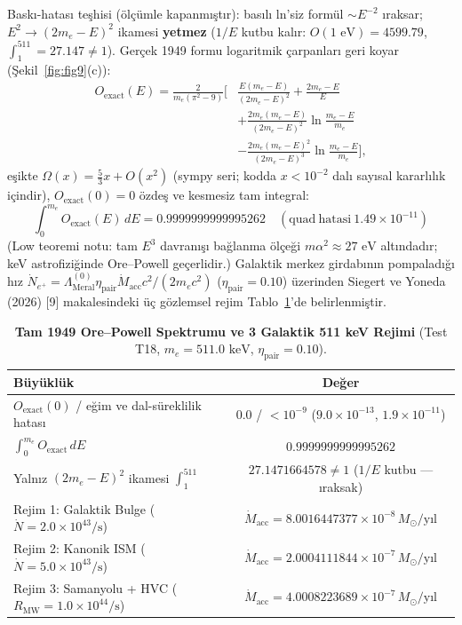 \documentclass[12pt,a4paper]{article}
\begin{document}
Baskı-hatası teşhisi (ölçümle kapanmıştır): basılı ln'siz formül $\sim E^{-2}$ ıraksar; $E^2\to(2m_e-E)^2$ ikamesi \textbf{yetmez} ($1/E$ kutbu kalır: $O(1\text{ eV})=4599.79$, $\int_1^{511}=27.147\ne1$). Gerçek 1949 formu logaritmik çarpanları geri koyar (Şekil~\ref{fig:fig9}(c)):
\begin{equation}
\begin{split}
O_{\mathrm{exact}}(E) = \frac{2}{m_e(\pi^2-9)} \Bigg[ &\frac{E(m_e-E)}{(2m_e-E)^2} + \frac{2m_e-E}{E} \\
&+ \frac{2m_e(m_e-E)}{(2m_e-E)^2}\ln\frac{m_e-E}{m_e} \\
&- \frac{2m_e(m_e-E)^2}{(2m_e-E)^3}\ln\frac{m_e-E}{m_e} \Bigg],
\end{split}
\label{eq:oexact}
\end{equation}
eşikte $\Omega(x)=\frac53x+O(x^2)$ (sympy seri; kodda $x<10^{-2}$ dalı sayısal kararlılık içindir), $O_{\mathrm{exact}}(0)=0$ özdeş ve kesmesiz tam integral:
\begin{equation}
\boxed{\int_0^{m_e} O_{\mathrm{exact}}(E)\,dE = 0.9999999999995262 \quad (\mathrm{quad\ hatasi\ } 1.49\times 10^{-11})}
\label{eq:opnorm}
\end{equation}
(Low teoremi notu: tam $E^3$ davranışı bağlanma ölçeği $m\alpha^2\approx27\text{ eV}$ altındadır; keV astrofiziğinde Ore--Powell geçerlidir.) Galaktik merkez girdabının pompaladığı hız $\dot{N}_{e^+} = \Lambda_{\mathrm{Meral}}^{(0)}\eta_{\mathrm{pair}}\dot{M}_{\mathrm{acc}}c^2/(2m_ec^2)$ ($\eta_{\mathrm{pair}}=0.10$) üzerinden Siegert ve Yoneda (2026) [9] makalesindeki üç gözlemsel rejim Tablo~\ref{tab:t18}'de belirlenmiştir.

\begin{table}[!htbp]
\centering
\footnotesize
\setlength{\tabcolsep}{3pt}
\caption{\textbf{Tam 1949 Ore--Powell Spektrumu ve 3 Galaktik 511 keV Rejimi} (Test T18, $m_e=511.0\text{ keV}$, $\eta_{\mathrm{pair}}=0.10$).}
\label{tab:t18}
\vspace{0.1cm}
\begin{tabular}{@{}l|c@{}}
\hline
Büyüklük & Değer \\
\hline
$O_{\mathrm{exact}}(0)$ / eğim ve dal-süreklilik hatası & $0.0$ / $<10^{-9}$ ($9.0\times10^{-13}$, $1.9\times10^{-11}$) \\
$\int_0^{m_e} O_{\mathrm{exact}}\,dE$ & $0.9999999999995262$ \\
Yalnız $(2m_e-E)^2$ ikamesi $\int_1^{511}$ & $27.1471664578\ne1$ ($1/E$ kutbu --- ıraksak) \\
Rejim 1: Galaktik Bulge ($\dot{N}=2.0\times10^{43}\text{/s}$) & $\dot{M}_{\mathrm{acc}} = 8.0016447377\times 10^{-8}\,M_\odot\text{/yıl}$ \\
Rejim 2: Kanonik ISM ($\dot{N}=5.0\times10^{43}\text{/s}$) & $\dot{M}_{\mathrm{acc}} = 2.0004111844\times 10^{-7}\,M_\odot\text{/yıl}$ \\
Rejim 3: Samanyolu + HVC ($R_{\mathrm{MW}}=1.0\times10^{44}\text{/s}$) & $\dot{M}_{\mathrm{acc}} = 4.0008223689\times 10^{-7}\,M_\odot\text{/yıl}$ \\
\hline
\end{tabular}
\end{table}
\end{document}
